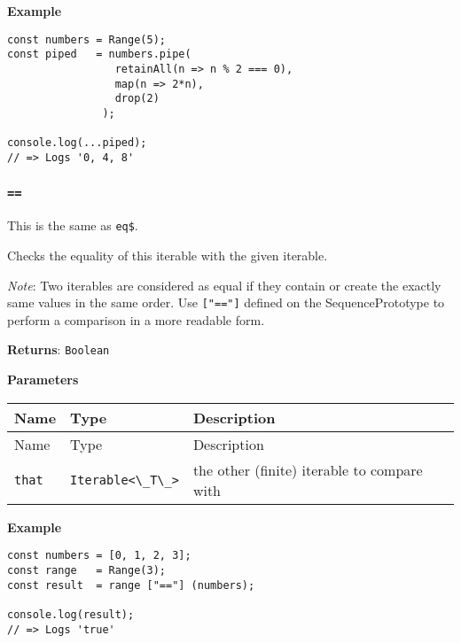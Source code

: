 \textbf{Example}

\begin{lstlisting}[label=30162c8f-03dd-4637-92b6-d142debe1612]
const numbers = Range(5);
const piped   = numbers.pipe(
                 retainAll(n => n % 2 === 0),
                 map(n => 2*n),
                 drop(2)
               );
                                           
console.log(...piped);
// => Logs '0, 4, 8'
\end{lstlisting}

\hypertarget{1b04f6d9-570a-4d48-9d9b-416f9e24870e}{%
\subsubsection{\texorpdfstring{\texttt{==}}{==}}\label{1b04f6d9-570a-4d48-9d9b-416f9e24870e}}

This is the same as \passthrough{\lstinline!eq$!}.

Checks the equality of this iterable with the given iterable.

\emph{Note}: Two iterables are considered as equal if they contain or
create the exactly same values in the same order. Use
\passthrough{\lstinline!["=="]!} defined on the SequencePrototype to
perform a comparison in a more readable form.

\textbf{Returns}: \passthrough{\lstinline!Boolean!}

\textbf{Parameters}

\begin{longtable}[]{
  >{\raggedright\arraybackslash}p{}
  >{\raggedright\arraybackslash}p{}
  >{\raggedright\arraybackslash}p{}@{}}

\toprule\noalign{}
Name & Type & Description \\
\midrule\noalign{}
\endfirsthead
\toprule\noalign{}
Name & Type & Description \\
\midrule\noalign{}
\endhead
\bottomrule\noalign{}
\endlastfoot
\passthrough{\lstinline!that!} &
\passthrough{\lstinline!Iterable<\_T\_>!} & the other (finite) iterable
to compare with \\
\end{longtable}

\textbf{Example}

\begin{lstlisting}[label=99a9d6a3-56f6-4aba-8e0b-cfb53094b323]
const numbers = [0, 1, 2, 3];
const range   = Range(3);
const result  = range ["=="] (numbers);
                                    
console.log(result);
// => Logs 'true'
\end{lstlisting}

